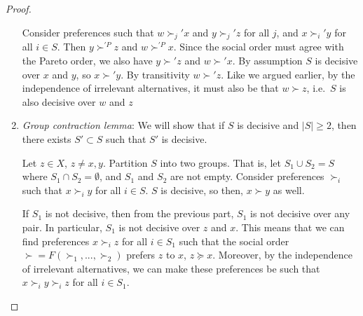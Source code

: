 \begin{proof}
\begin{enumerate}
    Consider preferences such that $w \succ_j' x$ and $y \succ_j' z$
    for all $j$, and $x \succ_i' y$ for all $i \in S$. Then
    $y \succ^{'P} z$ and $w \succ^{'P} x$. Since the social order must
    agree with the Pareto order, we also have $y \succ' z$ and
    $w \succ' x$. By assumption $S$ is decisive over $x$ and $y$, so
    $x \succ' y$. By transitivity $w \succ' z$. Like we argued
    earlier, by the independence of irrelevant alternatives, it must
    also be that $w \succ z$, i.e.\ $S$ is also decisive over $w$ and
    $z$
  \item \emph{Group contraction lemma}: We will show that if $S$ is
    decisive and $|S| \geq 2$, then there exists $S' \subset S$ such
    that $S'$ is decisive. 
    
    Let $z \in X$, $z \neq x,y$. Partition $S$ into two groups. That is, let $S_1
    \cup S_2 = S$ where $S_1 \cap S_2 = \emptyset$, and $S_1$ and $S_2$
    are not empty. Consider preferences $\succ_i$ such that $x \succ_i
    y$ for all $i \in S$. $S$ is decisive, so then, $x \succ y$ as
    well.

    If $S_1$ is not decisive, then from the previous part, $S_1$ is
    not decisive over any pair. In particular, $S_1$ is not decisive
    over $z$ and $x$. This means that we can find preferences $x
    \succ_i z$ for all $i \in S_1$ such that the social
    order $\succ=F(\succ_1,
    ..., \succ_2)$ prefers $z$ to $x$, $z \succeq x$. Moreover, by the
    independence of irrelevant alternatives, we can make these
    preferences be such that $x \succ_i y \succ_i z$ for all $i \in
    S_1$. 


\end{enumerate}
\end{proof}

